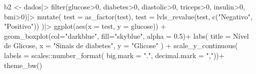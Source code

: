 \documentclass[
  letterpaper,
  DIV=11,
  numbers=noendperiod]{scrartcl}
\newenvironment{Shaded}{\begin{snugshade}}{\end{snugshade}}
\newcommand{\AttributeTok}[1]{\textcolor[rgb]{0.40,0.45,0.13}{#1}}
\newcommand{\DecValTok}[1]{\textcolor[rgb]{0.68,0.00,0.00}{#1}}
\newcommand{\FloatTok}[1]{\textcolor[rgb]{0.68,0.00,0.00}{#1}}
\newcommand{\FunctionTok}[1]{\textcolor[rgb]{0.28,0.35,0.67}{#1}}
\newcommand{\NormalTok}[1]{\textcolor[rgb]{0.00,0.23,0.31}{#1}}
\newcommand{\OtherTok}[1]{\textcolor[rgb]{0.00,0.23,0.31}{#1}}
\newcommand{\SpecialCharTok}[1]{\textcolor[rgb]{0.37,0.37,0.37}{#1}}
\newcommand{\StringTok}[1]{\textcolor[rgb]{0.13,0.47,0.30}{#1}}
\begin{document}
\begin{Shaded}
\begin{Highlighting}[]
\NormalTok{b2 }\OtherTok{\textless{}{-}}\NormalTok{ dados}\SpecialCharTok{|\textgreater{}}
  \FunctionTok{filter}\NormalTok{(glucose}\SpecialCharTok{\textgreater{}}\DecValTok{0}\NormalTok{, diabetes}\SpecialCharTok{\textgreater{}}\DecValTok{0}\NormalTok{, diastolic}\SpecialCharTok{\textgreater{}}\DecValTok{0}\NormalTok{,}
\NormalTok{         triceps}\SpecialCharTok{\textgreater{}}\DecValTok{0}\NormalTok{, insulin}\SpecialCharTok{\textgreater{}}\DecValTok{0}\NormalTok{, bmi}\SpecialCharTok{\textgreater{}}\DecValTok{0}\NormalTok{)}\SpecialCharTok{|\textgreater{}}
  \FunctionTok{mutate}\NormalTok{(}
    \AttributeTok{test =} \FunctionTok{as\_factor}\NormalTok{(test),}
    \AttributeTok{test =} \FunctionTok{lvls\_revalue}\NormalTok{(test, }\FunctionTok{c}\NormalTok{(}\StringTok{"Negativo"}\NormalTok{, }\StringTok{"Positivo"}\NormalTok{))}
\NormalTok{  )}\SpecialCharTok{|\textgreater{}}
  \FunctionTok{ggplot}\NormalTok{(}\FunctionTok{aes}\NormalTok{(}\AttributeTok{x =}\NormalTok{ test, }\AttributeTok{y =}\NormalTok{ glucose)) }\SpecialCharTok{+}
  \FunctionTok{geom\_boxplot}\NormalTok{(}\AttributeTok{col=}\StringTok{"darkblue"}\NormalTok{, }\AttributeTok{fill=}\StringTok{"skyblue"}\NormalTok{, }\AttributeTok{alpha =} \FloatTok{0.5}\NormalTok{)}\SpecialCharTok{+}
  \FunctionTok{labs}\NormalTok{(}
    \AttributeTok{title =} \StringTok{\textquotesingle{}Nível de Glicose\textquotesingle{}}\NormalTok{,}
    \AttributeTok{x =} \StringTok{"Sinais de diabetes"}\NormalTok{,}
    \AttributeTok{y =} \StringTok{"Glicose"}
\NormalTok{  ) }\SpecialCharTok{+}
  \FunctionTok{scale\_y\_continuous}\NormalTok{(}
    \AttributeTok{labels =}\NormalTok{ scales}\SpecialCharTok{::}\FunctionTok{number\_format}\NormalTok{(}
      \AttributeTok{big.mark =} \StringTok{"."}\NormalTok{,}
      \AttributeTok{decimal.mark =} \StringTok{","}\NormalTok{))}\SpecialCharTok{+}
  \FunctionTok{theme\_bw}\NormalTok{()}


\end{Highlighting}
\end{Shaded}
\end{document}
